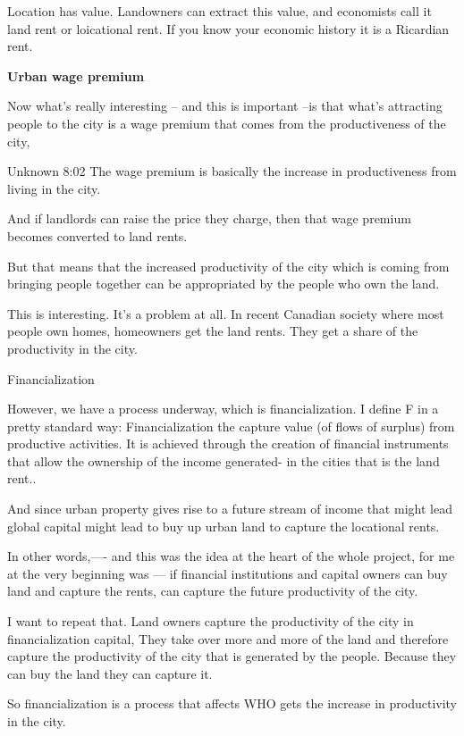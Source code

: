 Location has value. Landowners can extract this value, and economists call it land rent or loicational rent. If you know your economic history it is a Ricardian rent.

\textbf{Urban wage premium }

Now what's really interesting -- and this is important --is that what's attracting people to the city is a wage premium that comes from the productiveness of the city,  

Unknown 8:02
The wage premium is basically the increase in productiveness from  living in the city. 


And if landlords can raise the price they charge, then that wage premium becomes converted to land rents.


But that means that the increased productivity of the city which is coming from bringing people together
can be  appropriated by the people who own the land.

This is interesting. It's a problem at all. In recent Canadian society where most people own homes,  homeowners get the land rents. They get a share of the productivity in the city.


Financialization

However, we have a process underway, which is financialization. I define F in a pretty standard way: Financialization the capture value (of flows of surplus) from productive activities. It is achieved through the creation of financial instruments that allow the ownership of the income generated- in the cities that is the land rent.. 



And since urban property gives rise to a future stream of income that might lead global capital might lead to buy up urban land to capture the locational rents. 

In other words,---- and this was the idea at the heart of the whole project, for me at the very beginning was --- if financial institutions and capital owners can buy land and capture the rents, can capture the future productivity of the city.

I want to repeat that. Land owners capture the productivity of the city in financialization capital, 
They take over more and more of the land and therefore capture the productivity of the city that is generated by the people. Because they can buy the land they can capture it. 

So financialization is a process that affects 
WHO gets the increase in productivity in the city.

